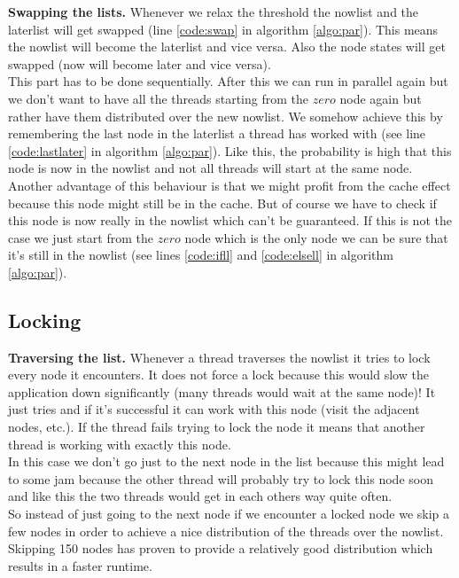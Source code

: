 \documentclass[letterpaper]{article}
\newcommand{\mypar}[1]{{\bf #1.}}
\begin{document}
\mypar{Swapping the lists}
Whenever we relax the threshold the nowlist and the laterlist will get swapped (line \ref{code:swap} in algorithm \ref{algo:par}). This means the nowlist will become the laterlist and vice versa. Also the node states will get swapped (now will become later and vice versa).\\
This part has to be done sequentially. After this we can run in parallel again but we don't want to have all the threads starting from the $zero$ node again but rather have them distributed over the new nowlist. We somehow achieve this by remembering the last node in the laterlist a thread has worked with (see line \ref{code:lastlater} in algorithm \ref{algo:par}). Like this, the probability is high that this node is now in the nowlist and not all threads will start at the same node. Another advantage of this behaviour is that we might profit from the cache effect because this node might still be in the cache. But of course we have to check if this node is now really in the nowlist which can't be guaranteed. If this is not the case we just start from the $zero$ node which is the only node we can be sure that it's still in the nowlist (see lines \ref{code:ifll} and \ref{code:elsell} in algorithm \ref{algo:par}).

\subsection{Locking}\label{ssec:lock}

\mypar{Traversing the list}
Whenever a thread traverses the nowlist it tries to lock every node it encounters. It does not force a lock because this would slow the application down significantly (many threads would wait at the same node)! It just tries and if it's successful it can work with this node (visit the adjacent nodes, etc.). If the thread fails trying to lock the node it means that another thread is working with exactly this node.\\
In this case we don't go just to the next node in the list because this might lead to some jam because the other thread will probably try to lock this node soon and like this the two threads would get in each others way quite often.\\
So instead of just going to the next node if we encounter a locked node we skip a few nodes in order to achieve a nice distribution of the threads over the nowlist. Skipping 150 nodes has proven to provide a relatively good distribution which results in a faster runtime.
\end{document}
